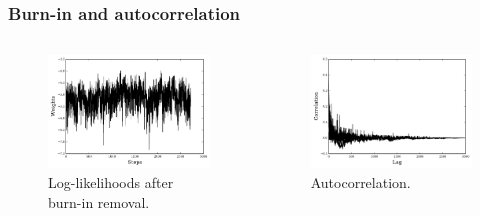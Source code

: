 \documentclass{beamer}
\begin{document}



\begin{frame}
\frametitle{Burn-in and autocorrelation}
\begin{columns}[c] %
\begin{figure}
\includegraphics[width=1.1\linewidth]{weights_example.pdf}
\caption{Log-likelihoods after burn-in removal.}
\end{figure}
\begin{figure}
\includegraphics[width=1.1\linewidth]{ac_fpol.pdf}
\caption{Autocorrelation.}
\end{figure}
\end{columns}

\end{frame}
\end{document}

